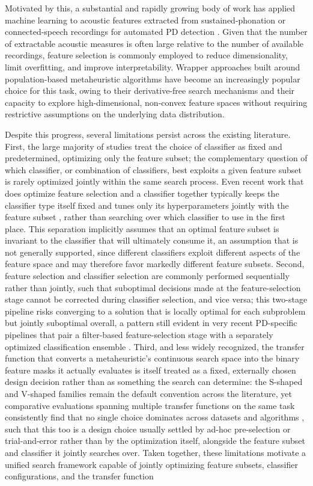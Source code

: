 Motivated by this, a substantial and rapidly growing body of work has applied machine learning to acoustic features extracted from sustained-phonation or connected-speech recordings for automated PD detection \cite{Amato:2023}. Given that the number of extractable acoustic measures is often large relative to the number of available recordings, feature selection is commonly employed to reduce dimensionality, limit overfitting, and improve interpretability. Wrapper approaches built around population-based metaheuristic algorithms have become an increasingly popular choice for this task, owing to their derivative-free search mechanisms and their capacity to explore high-dimensional, non-convex feature spaces without requiring restrictive assumptions on the underlying data distribution.

Despite this progress, several limitations persist across the existing literature. First, the large majority of studies treat the choice of classifier as fixed and predetermined, optimizing only the feature subset; the complementary question of which classifier, or combination of classifiers, best exploits a given feature subset is rarely optimized jointly within the same search process. Even recent work that does optimize feature selection and a classifier together typically keeps the classifier type itself fixed and tunes only its hyperparameters jointly with the feature subset \cite{Shukla:2024}, rather than searching over which classifier to use in the first place. This separation implicitly assumes that an optimal feature subset is invariant to the classifier that will ultimately consume it, an assumption that is not generally supported, since different classifiers exploit different aspects of the feature space and may therefore favor markedly different feature subsets. Second, feature selection and classifier selection are commonly performed sequentially rather than jointly, such that suboptimal decisions made at the feature-selection stage cannot be corrected during classifier selection, and vice versa; this two-stage pipeline risks converging to a solution that is locally optimal for each subproblem but jointly suboptimal overall, a pattern still evident in very recent PD-specific pipelines that pair a filter-based feature-selection stage with a separately optimized classification ensemble \cite{Gunduz:2025}. Third, and less widely recognized, the transfer function that converts a metaheuristic's continuous search space into the binary feature masks it actually evaluates is itself treated as a fixed, externally chosen design decision rather than as something the search can determine: the S-shaped and V-shaped families remain the default convention across the literature, yet comparative evaluations spanning multiple transfer functions on the same task consistently find that no single choice dominates across datasets and algorithms \cite{Kuntalp:2024}, such that this too is a design choice usually settled by ad-hoc pre-selection or trial-and-error rather than by the optimization itself, alongside the feature subset and classifier it jointly searches over. Taken together, these limitations motivate a unified search framework capable of jointly optimizing feature subsets, classifier configurations, and the transfer function 
